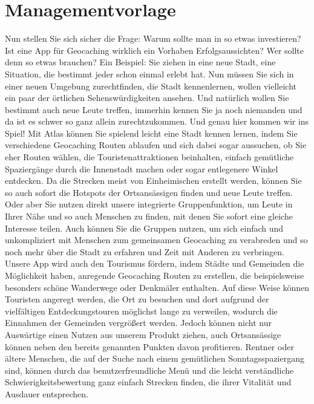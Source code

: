 \documentclass[a4paper, 12pt]{article}
\begin{document}
\section{Managementvorlage}
Nun stellen Sie sich sicher die Frage: Warum sollte man in so etwas investieren? Ist eine App für Geocaching wirklich ein Vorhaben Erfolgsaussichten? Wer sollte denn so etwas brauchen?\newline
Ein Beispiel: Sie ziehen in eine neue Stadt, eine Situation, die bestimmt jeder schon einmal erlebt hat. Nun müssen Sie sich in einer neuen Umgebung zurechtfinden, die Stadt kennenlernen, wollen vielleicht ein paar der örtlichen Sehenswürdigkeiten ansehen. Und natürlich wollen Sie bestimmt auch neue Leute treffen, immerhin kennen Sie ja noch niemanden und da ist es schwer so ganz allein zurechtzukommen.
Und genau hier kommen wir ins Spiel!\newline
Mit Atlas können Sie spielend leicht eine Stadt kennen lernen, indem Sie verschiedene Geocaching Routen ablaufen und sich dabei sogar aussuchen, ob Sie eher Routen wählen, die Touristenattraktionen beinhalten, einfach gemütliche Spaziergänge durch die Innenstadt machen oder sogar entlegenere Winkel entdecken. Da die Strecken meist von Einheimischen erstellt werden, können Sie so auch sofort die Hotspots der Ortsansässigen finden und neue Leute treffen.\newline
Oder aber Sie nutzen direkt unsere integrierte Gruppenfunktion, um Leute in Ihrer Nähe und so auch Menschen zu finden, mit denen Sie sofort eine gleiche Interesse teilen. Auch können Sie die Gruppen nutzen, um sich einfach und unkompliziert mit Menschen zum gemeinsamen Geocaching zu verabreden und so noch mehr über die Stadt zu erfahren und Zeit mit Anderen zu verbringen.\newline
Unsere App wird auch den Tourismus fördern, indem Städte und Gemeinden die Möglichkeit haben, anregende Geocaching Routen zu erstellen, die beispielsweise besonders schöne Wanderwege oder Denkmäler enthalten. Auf diese Weise können Touristen angeregt werden, die Ort zu besuchen und dort aufgrund der vielfältigen Entdeckungstouren möglichst lange zu verweilen, wodurch die Einnahmen der Gemeinden  vergrößert werden.\newline
Jedoch können nicht nur Auswärtige einen Nutzen aus unserem Produkt ziehen, auch Ortsansässige können neben den bereits genannten Punkten davon profitieren.\newline
Rentner oder ältere Menschen, die auf der Suche nach einem gemütlichen Sonntagsspaziergang sind, können durch das benutzerfreundliche Menü und die leicht verständliche Schwierigkeitsbewertung ganz einfach Strecken finden, die ihrer Vitalität und Ausdauer entsprechen.
\end{document}
